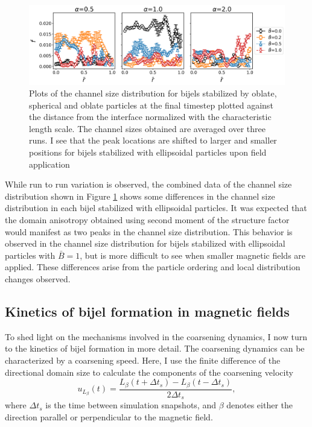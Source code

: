 \begin{figure} 
        \centering 
        \includegraphics[scale = 0.4]{figures/results/paper1/CSD_ss.png} 
        \caption{Plots of the channel size distribution for bijels stabilized by oblate, spherical and oblate particles at the final timestep plotted
                 against the distance from the interface normalized with the characteristic length scale. The channel sizes obtained are averaged over 
                 three runs. I see that the peak locations are shifted to larger and smaller positions for bijels stabilized with ellipsoidal particles
                 upon field application} 
        \label{fig:CSD_B_ss}
    \end{figure}

While run to run variation is observed, the combined data of the channel size distribution shown in Figure \ref{fig:CSD_B_ss} shows some differences 
in the channel size distribution in each bijel stabilized with ellipsoidal particles. It was expected that the domain anisotropy obtained using second moment of the 
structure factor would manifest as two peaks in the channel size distribution. \cite{karthikeyan_formation_2024} This behavior is observed in the channel size 
distribution for bijels stabilized with ellipsoidal particles with $\bar{B} = 1$, but is more difficult to see when smaller magnetic fields are applied. 
These differences arise from the particle ordering and local distribution changes observed. 

\subsection{Kinetics of bijel formation in magnetic fields}

To shed light on the mechanisms involved in the coarsening dynamics,
I now turn to the kinetics of bijel formation in more detail. The
coarsening dynamics can be characterized by a coarsening speed. Here,
I use the finite difference of the directional domain size to
calculate the components of the coarsening velocity
%
\begin{equation}
u_{L_\beta}(t) = \frac{L_\beta(t+\Delta t_s)-L_\beta(t-\Delta t_s)}{2\Delta t_s} ,
\end{equation}
%
where \(\Delta t_s\) is the time between simulation
snapshots, and $\beta$ denotes either the direction parallel or perpendicular to the magnetic field.

